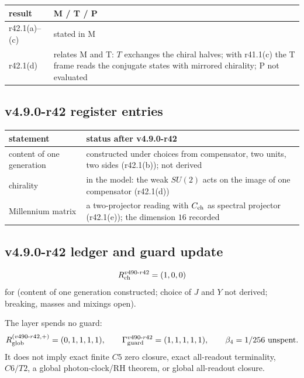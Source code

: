 \begin{center}
\small
\begin{tabular}{@{}>{\raggedright\arraybackslash}p{}>{\raggedright\arraybackslash}p{}@{}}
\toprule
result & M / T / P\\
\midrule
r42.1(a)--(c) & stated in M\\
r42.1(d) & relates M and T: \(T\) exchanges the chiral halves; with r41.1(c) the T frame reads the conjugate states with mirrored chirality; P not evaluated\\
\bottomrule
\end{tabular}
\end{center}

\subsection*{v4.9.0-r42 register entries}
\label{subsec:v490-r42-register}

\begin{center}
\small
\begin{tabular}{@{}>{\raggedright\arraybackslash}p{}>{\raggedright\arraybackslash}p{}@{}}
\toprule
statement & status after v4.9.0-r42\\
\midrule
content of one generation & constructed under choices from compensator, two units, two sides (r42.1(b)); not derived\\
chirality & in the model: the weak \(SU(2)\) acts on the image of one compensator (r42.1(d))\\
Millennium matrix & a two-projector reading with \(C_{\rm ch}\) as spectral projector (r42.1(e)); the dimension \(16\) recorded\\
\bottomrule
\end{tabular}
\end{center}

\subsection*{v4.9.0-r42 ledger and guard update}
\label{subsec:v490-r42-ledger-guard}

\[
R_{\rm ch}^{v490\text{-}r42}=(1,0,0)
\]
for (content of one generation constructed; choice of \(J\) and \(Y\) not derived; breaking, masses and mixings open).

The layer spends no guard:
\[
R_{\rm glob}^{(v490\text{-}r42,+)}=(0,1,1,1,1),
\qquad
\Gamma_{\rm guard}^{v490\text{-}r42}=(1,1,1,1,1),
\qquad
\beta_4=1/256\ \text{unspent}.
\]
It does not imply exact finite \(C5\) zero closure, exact all-readout terminality,
\(C6/T2\), a global photon-clock/RH theorem, or global all-readout closure.
